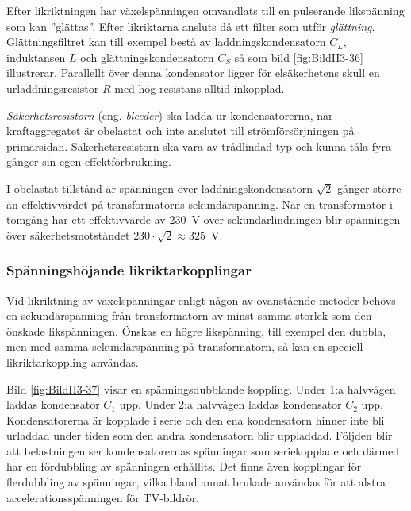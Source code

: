
Efter likriktningen har växelspänningen omvandlats till en pulserande
likspänning som kan ''glättas''.
Efter likriktarna ansluts då ett filter som utför \emph{glättning}.
Glättningsfiltret kan till exempel bestå av laddningskondensatorn \(C_L\), induktansen \(L\) och glättningskondensatorn \(C_S\) så som bild \ref{fig:BildII3-36}
illustrerar.
Parallellt över denna kondensator ligger för elsäkerhetens skull en
urladdningsresistor \(R\) med hög resistans alltid inkopplad.

\emph{Säkerhetsresistorn} (eng. \emph{bleeder}) ska ladda ur kondensatorerna,
när kraftaggregatet är obelastat och inte anslutet till strömförsörjningen på primärsidan.
Säkerhetsresistorn ska vara av trådlindad typ och kunna tåla fyra gånger sin
egen effektförbrukning.

I obelastat tillstånd är spänningen över laddningskondensatorn \(\sqrt{2}\)
gånger större än effektivvärdet på transformatorns sekundärspänning.
När en transformator i tomgång har ett effektivvärde av \SI{230}{\volt} över
sekundärlindningen blir spänningen över säkerhetsmotståndet
\(230\cdot\sqrt{2} \approx 325\)~V.

\subsubsection{Spänningshöjande likriktarkopplingar}

Vid likriktning av växelspänningar enligt någon av ovanstående metoder behövs
en sekundärspänning från transformatorn av minst samma storlek som den önskade
likspänningen.
Önskas en högre likspänning, till exempel den dubbla, men med samma sekundärspänning
på transformatorn, så kan en speciell likriktarkoppling användas.


Bild \ref{fig:BildII3-37} visar en spänningsdubblande koppling.
Under 1:a halvvågen laddas kondensator \(C_1\) upp.
Under 2:a halvvågen laddas kondensator \(C_2\) upp.
Kondensatorerna är kopplade i serie och den ena kondensatorn hinner inte bli
urladdad under tiden som den andra kondensatorn blir uppladdad.
Följden blir att belastningen ser kondensatorernas spänningar som seriekopplade
och därmed har en fördubbling av spänningen erhållits.
Det finns även kopplingar för flerdubbling av spänningar, vilka bland annat
brukade användas för att alstra accelerationsspänningen för TV-bildrör.

